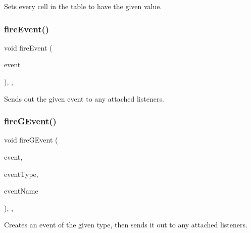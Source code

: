 Sets every cell in the table to have the given value. 

\mbox{\label{classGObservable_a63e5e5a6227c59c928493b11aceb0f67}} 
\subsubsection{\texorpdfstring{fire\+Event()}{fireEvent()}}
{\footnotesize\ttfamily void fire\+Event (\begin{DoxyParamCaption}\item[{\mbox{\hyperlink{classGEvent}{G\+Event}} \&}]{event }\end{DoxyParamCaption})\hspace{0.3cm}{\ttfamily [protected]}, {\ttfamily [virtual]}, {\ttfamily [inherited]}}



Sends out the given event to any attached listeners. 

\mbox{\label{classGObservable_ab3983ea07337b52020a29cc00c653d8d}} 
\subsubsection{\texorpdfstring{fire\+G\+Event()}{fireGEvent()}\hspace{0.1cm}{\footnotesize\ttfamily [1/8]}}
{\footnotesize\ttfamily void fire\+G\+Event (\begin{DoxyParamCaption}\item[{Q\+Event $\ast$}]{event,  }\item[{Event\+Type}]{event\+Type,  }\item[{const std\+::string \&}]{event\+Name }\end{DoxyParamCaption})\hspace{0.3cm}{\ttfamily [protected]}, {\ttfamily [virtual]}, {\ttfamily [inherited]}}



Creates an event of the given type, then sends it out to any attached listeners. 

\mbox{\label{classGObservable_a01fdf1b0e0dbd49e189fe4514e010411}} 
